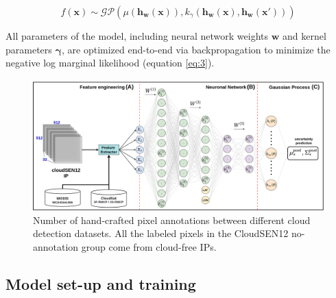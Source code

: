 \documentclass[a4paper, nobind]{templates/cdethesis}
\begin{document}
\begin{equation}
f(\mathbf{x}) \sim \mathcal{GP}(
    \mu(\mathbf{h_w(x)}),
    k_{\gamma}(\mathbf{h_w(x)}, \mathbf{h_w({x}')})
)
\end{equation}

All parameters of the model, including neural network weights \(\mathbf{w}\) and kernel parameters \(\mathbf{\gamma}\), are optimized end-to-end via backpropagation to minimize the negative log marginal likelihood (equation \ref{eq:3}).

\begin{figure}[!h]
    \centering
    \includegraphics[width=1\linewidth]{figures/chapter02/figure02.png}
    \caption{Number of hand-crafted pixel annotations between different cloud detection datasets. All the labeled pixels in the CloudSEN12 no-annotation group come from cloud-free IPs.}
    \label{fig:figure02}
\end{figure}

\hypertarget{model-set-up-and-training}{%
\subsection{Model set-up and training}\label{model-set-up-and-training}}
\end{document}
